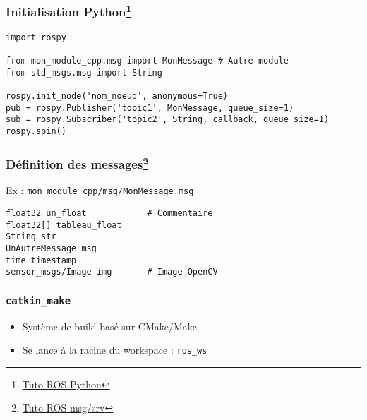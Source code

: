 \documentclass{beamer}
\begin{document}
\begin{frame}[fragile]
\frametitle{Initialisation Python\footnote{\href{http://wiki.ros.org/ROS/Tutorials/WritingPublisherSubscriber\%28python\%29
}{Tuto ROS Python}}}

\begin{verbatim}
import rospy

from mon_module_cpp.msg import MonMessage # Autre module
from std_msgs.msg import String

rospy.init_node('nom_noeud', anonymous=True)
pub = rospy.Publisher('topic1', MonMessage, queue_size=1)
sub = rospy.Subscriber('topic2', String, callback, queue_size=1)
rospy.spin()
\end{verbatim}
\end{frame}
    
\begin{frame}[fragile]
\frametitle{Définition des messages\footnote{\href{http://wiki.ros.org/ROS/Tutorials/CreatingMsgAndSrv
}{Tuto ROS msg/srv}}}
Ex : \texttt{mon\_module\_cpp/msg/MonMessage.msg}

\begin{verbatim}
float32 un_float            # Commentaire
float32[] tableau_float
String str
UnAutreMessage msg
time timestamp
sensor_msgs/Image img       # Image OpenCV
\end{verbatim}

\end{frame}


\begin{frame}
\frametitle{\texttt{catkin\_make}}
\begin{itemize}
    \item Système de build basé sur CMake/Make
    \item Se lance à la racine du workspace : \texttt{ros\_ws}
\end{itemize}
\end{frame}
\end{document}
